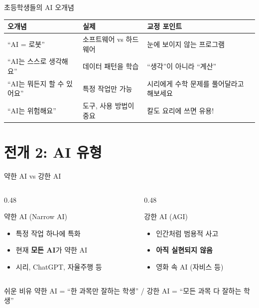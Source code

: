 \documentclass[aspectratio=169]{beamer}
\begin{document}
\begin{frame}{초등학생들의 AI 오개념}
\begin{center}
\small
\begin{tabular}{|p{3.5cm}|p{4cm}|p{4cm}|}
\hline
\rowcolor{tableheader}
\textbf{오개념} & \textbf{실제} & \textbf{교정 포인트} \\
\hline
``AI = 로봇'' & 소프트웨어 vs 하드웨어 & 눈에 보이지 않는 프로그램 \\
\hline
``AI는 스스로 생각해요'' & 데이터 패턴을 학습 & ``생각''이 아니라 ``계산'' \\
\hline
``AI는 뭐든지 할 수 있어요'' & 특정 작업만 가능 & 시리에게 수학 문제를 풀어달라고 해보세요 \\
\hline
``AI는 위험해요'' & 도구, 사용 방법이 중요 & 칼도 요리에 쓰면 유용! \\
\hline
\end{tabular}
\end{center}
\end{frame}

\section{ 전개 2: AI 유형}

\begin{frame}{약한 AI vs 강한 AI}
\begin{columns}
\begin{column}{0.48\textwidth}
\begin{block}{ 약한 AI (Narrow AI)}
\begin{itemize}
    \item 특정 작업 하나에 특화
    \item 현재 \textbf{모든 AI}가 약한 AI
    \item 시리, ChatGPT, 자율주행 등
\end{itemize}
\end{block}
\end{column}
\begin{column}{0.48\textwidth}
\begin{block}{ 강한 AI (AGI)}
\begin{itemize}
    \item 인간처럼 범용적 사고
    \item \textbf{아직 실현되지 않음}
    \item 영화 속 AI (자비스 등)
\end{itemize}
\end{block}
\end{column}
\end{columns}

\vspace{0.5cm}
\begin{alertblock}{ 쉬운 비유}
약한 AI = ``한 과목만 잘하는 학생'' / 강한 AI = ``모든 과목 다 잘하는 학생''
\end{alertblock}
\end{frame}
\end{document}
